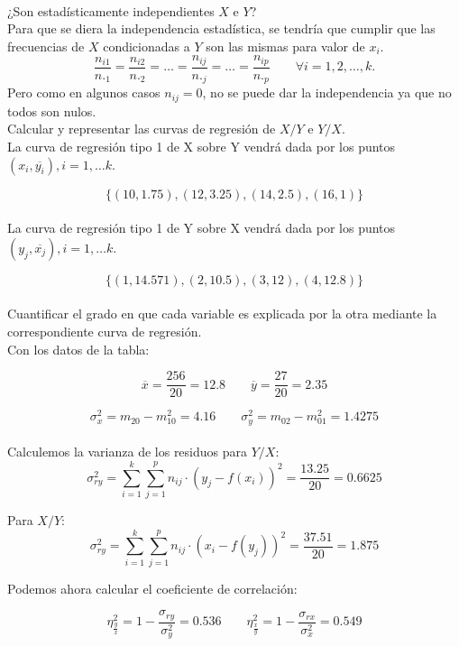 \\
\subproblem
¿Son estadísticamente independientes $X$ e $Y$?\\

Para que se diera la independencia estadística, se tendría que cumplir que las frecuencias de $X$ condicionadas a $Y$ son las mismas para valor de $x_i$. 
$$ \dfrac{n_{i1}}{n._1}=\dfrac{n_{i2}}{n._2}= \dots = \dfrac{n_{ij}}{n._j} = \dots = \dfrac{n_{ip}}{n._p} \qquad \forall i = 1,2,\dots , k.$$
Pero como en algunos casos $n_{ij} = 0$, no se puede dar la independencia ya que no todos son nulos.\\

\subproblem Calcular y representar las curvas de regresión de $X/Y$ e $Y/X$.\\

La curva de regresión tipo 1 de X sobre Y vendrá dada por los puntos $(x_i, \overline{y_i}), i = 1, \dots k$.

$$\{(10, 1.75), (12, 3.25), (14, 2.5), (16, 1)\}$$\\


La curva de regresión tipo 1 de Y sobre X vendrá dada por los puntos $(y_j, \overline{x_j}), i = 1, \dots k$.

$$\{(1, 14.571), (2, 10.5), (3, 12), (4, 12.8) \}$$\\

\subproblem
Cuantificar el grado en que cada variable es explicada por la otra mediante la correspondiente curva de regresión. \\

Con los datos de la tabla:

$$\overline{x} = \dfrac{256}{20} = 12.8 \qquad \overline{y} = \dfrac{27}{20} = 2.35 $$

$$ \sigma_x^2 = m_{20} - m_{10}^2= 4.16 \qquad \sigma_y^2 = m_{02} - m_{01}^2= 1.4275 $$ \\

Calculemos la varianza de los residuos para $Y/X$:
$$\sigma_{ry}^2 = \sum_{i=1}^{k}\sum_{j=1}^p n_{ij}\cdot(y_j-f(x_i))^2 = \dfrac{13.25}{20} = 0.6625 $$

Para $X/Y$:
$$\sigma_{ry}^2 = \sum_{i=1}^{k}\sum_{j=1}^p n_{ij}\cdot(x_i-f(y_j))^2 = \dfrac{37.51}{20} = 1.875 $$

Podemos ahora calcular el coeficiente de correlación:

$$\eta_{\frac{y}{x}}^2 = 1 - \dfrac{\sigma_{ry}}{\sigma_y^2} = 0.536 \qquad 
\eta_{\frac{x}{y}}^2 = 1 - \dfrac{\sigma_{rx}}{\sigma_x^2} = 0.549 $$


